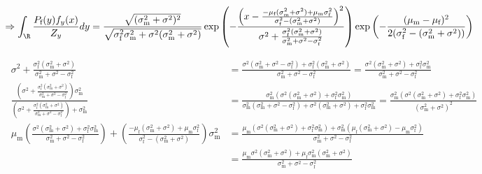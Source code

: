 \documentclass{article}\usepackage[]{graphicx}\usepackage[]{color}
\newcommand{\x}[1]{\text{#1}}
\begin{document}
\begin{landscape}
\begin{align*}
\\\Rightarrow \int_\R \frac{P_\x{f}(y)f_y(x)}{Z_y} dy&=\frac{\sqrt{(\sigma_\x{m}^2+\sigma^2)^2}}{\sqrt{\sigma_\x{f}^2\sigma_\x{m}^2+\sigma^2(\sigma_\x{m}^2+\sigma^2)}}\exp\left(-\frac{\left(x-\frac{-\mu_\x{f}(\sigma_\x{m}^2+\sigma^2)+\mu_\x{m}\sigma_\x{f}^2}{\sigma_\x{f}^2-(\sigma_\x{m}^2+\sigma^2)}\right)^2}{\sigma^2+\frac{\sigma_\x{f}^2(\sigma_\x{m}^2+\sigma^2)}{\sigma_\x{m}^2+\sigma^2-\sigma_\x{f}^2}}\right)\exp\left(-\frac{(\mu_\x{m}-\mu_\x{f})^2}{2(\sigma_\x{f}^2-(\sigma_\x{m}^2+\sigma^2))}\right)
\end{align*}
\begin{align*}
\\\sigma^2+\frac{\sigma_\x{f}^2(\sigma_\x{m}^2+\sigma^2)}{\sigma_\x{m}^2+\sigma^2-\sigma_\x{f}^2}&=\frac{\sigma^2(\sigma_\x{m}^2+\sigma^2-\sigma_\x{f}^2)+\sigma_\x{f}^2(\sigma_\x{m}^2+\sigma^2)}{\sigma_\x{m}^2+\sigma^2-\sigma_\x{f}^2}=\frac{\sigma^2(\sigma_\x{m}^2+\sigma^2)+\sigma_\x{f}^2\sigma_\x{m}^2}{\sigma_\x{m}^2+\sigma^2-\sigma_\x{f}^2}
\\\frac{\left(\sigma^2+\frac{\sigma_\x{f}^2(\sigma_\x{m}^2+\sigma^2)}{\sigma_\x{m}^2+\sigma^2-\sigma_\x{f}^2}\right)\sigma_\x{m}^2}{\left(\sigma^2+\frac{\sigma_\x{f}^2(\sigma_\x{m}^2+\sigma^2)}{\sigma_\x{m}^2+\sigma^2-\sigma_\x{f}^2}\right)+\sigma_\x{m}^2}&=\frac{\sigma_\x{m}^2(\sigma^2(\sigma_\x{m}^2+\sigma^2)+\sigma_\x{f}^2\sigma_\x{m}^2)}{\sigma_\x{m}^2(\sigma_\x{m}^2+\sigma^2-\sigma_\x{f}^2)+\sigma^2(\sigma_\x{m}^2+\sigma^2)+\sigma_\x{f}^2\sigma_\x{m}^2}=\frac{\sigma_\x{m}^2(\sigma^2(\sigma_\x{m}^2+\sigma^2)+\sigma_\x{f}^2\sigma_\x{m}^2)}{(\sigma_\x{m}^2+\sigma^2)^2}
\\\mu_\x{m}\left(\frac{\sigma^2(\sigma_\x{m}^2+\sigma^2)+\sigma_\x{f}^2\sigma_\x{m}^2}{\sigma_\x{m}^2+\sigma^2-\sigma_\x{f}^2}\right)+\left(\frac{-\mu_\x{f}(\sigma_\x{m}^2+\sigma^2)+\mu_\x{m}\sigma_\x{f}^2}{\sigma_\x{f}^2-(\sigma_\x{m}^2+\sigma^2)}\right)\sigma_\x{m}^2&=\frac{\mu_\x{m}(\sigma^2(\sigma_\x{m}^2+\sigma^2)+\sigma_\x{f}^2\sigma_\x{m}^2)+\sigma_\x{m}^2(\mu_\x{f}(\sigma_\x{m}^2+\sigma^2)-\mu_\x{m}\sigma_\x{f}^2)}{\sigma_\x{m}^2+\sigma^2-\sigma_\x{f}^2}
\\&=\frac{\mu_\x{m}\sigma^2(\sigma_\x{m}^2+\sigma^2)+\mu_\x{f}\sigma_\x{m}^2(\sigma_\x{m}^2+\sigma^2)}{\sigma_\x{m}^2+\sigma^2-\sigma_\x{f}^2}
\end{align*}
\end{landscape}
\end{document}
